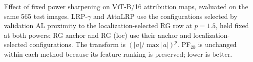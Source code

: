 \begin{table}[htbp]
\centering
\TableContent{
\small

}
\caption[Effect of fixed power sharpening on ViT-B/16 attribution maps]{Effect of fixed power sharpening on ViT-B/16 attribution maps, evaluated on the same 565 test images. LRP-$\gamma$ and AttnLRP use the configurations selected by validation AL proximity to the localization-selected RG row at $p=1.5$, held fixed at both powers; RG anchor and RG (loc) use their anchor and localization-selected configurations. The transform is $(|a|/\max|a|)^p$. PF$_{20}$ is unchanged within each method because its feature ranking is preserved; lower is better.}
\label{tab:sharpening-control}
\label{tab:rebuttal-common-power}
\end{table}
